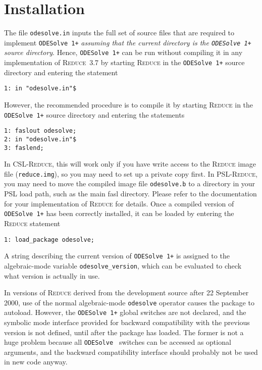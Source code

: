 \documentclass[a4paper]{article} %
\newcommand{\ODESolve}[1]{\texttt{ODESolve\,#1}}
\newcommand{\odesolve}{\texttt{odesolve}}
\newcommand{\REDUCE}{\textsc{Reduce}}
\begin{document}
\section{Installation}

The file \texttt{odesolve.in} inputs the full set of source files that
are required to implement \ODESolve{1+} \emph{assuming that the
current directory is the \ODESolve{1+} source directory}.  Hence,
\ODESolve{1+} can be run without compiling it in any implementation of
\REDUCE~3.7 by starting \REDUCE{} in the \ODESolve{1+} source
directory and entering the statement
\begin{verbatim}
1: in "odesolve.in"$
\end{verbatim}

However, the recommended procedure is to compile it by starting
\REDUCE{} in the \ODESolve{1+} source directory and entering the
statements
\begin{verbatim}
1: faslout odesolve;
2: in "odesolve.in"$
3: faslend;
\end{verbatim}
In CSL-\REDUCE{}, this will work only if you have write access to the
\REDUCE{} image file (\texttt{reduce.img}), so you may need to set up
a private copy first.  In PSL-\REDUCE{}, you may need to move the
compiled image file \texttt{odesolve.b} to a directory in your PSL
load path, such as the main fasl directory.  Please refer to the
documentation for your implementation of \REDUCE{} for details.  Once
a compiled version of \ODESolve{1+} has been correctly installed, it
can be loaded by entering the \REDUCE{} statement
\begin{verbatim}
1: load_package odesolve;
\end{verbatim}

A string describing the current version of \ODESolve{1+} is assigned
to the algebraic-mode variable \verb|odesolve_version|, which can be
evaluated to check what version is actually in use.

In versions of \REDUCE{} derived from the development source after 22
September 2000, use of the normal algebraic-mode \odesolve{} operator
causes the package to autoload.  However, the \ODESolve{1+} global
switches are not declared, and the symbolic mode interface provided
for backward compatibility with the previous version is not defined,
until after the package has loaded.  The former is not a huge problem
because all \ODESolve{} switches can be accessed as optional
arguments, and the backward compatibility interface should probably
not be used in new code anyway.
\end{document}
